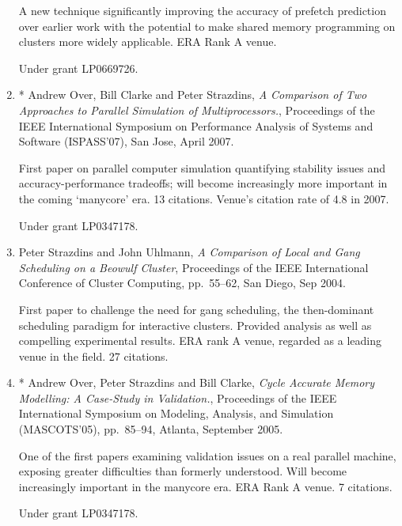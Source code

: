 \documentclass[a4paper,oneside,12pt]{article}
\begin{document}
\begin{enumerate}
A new technique significantly improving the accuracy of prefetch
prediction over earlier work with the potential to make shared memory
programming on clusters more widely applicable. ERA Rank A venue. 

Under grant LP0669726.

\item * Andrew Over, Bill Clarke and Peter Strazdins, 
{\em A Comparison of Two Approaches to Parallel Simulation of
      Multiprocessors.},
      Proceedings of the IEEE International Symposium on Performance Analysis of
      Systems and Software (ISPASS'07), San Jose, April 2007.

First paper on parallel computer simulation quantifying stability issues
and accuracy-performance tradeoffs; will become increasingly more
important in the coming `manycore' era. 13 citations. Venue's citation
rate of 4.8 in 2007.  

Under grant LP0347178.

\item  Peter Strazdins and John Uhlmann,
{\em A Comparison of Local and Gang Scheduling on a Beowulf
      Cluster}, Proceedings of the IEEE International Conference of Cluster
      Computing, pp.\ 55--62, San Diego, Sep 2004. 

First paper to challenge the need for gang scheduling, the
then-dominant scheduling paradigm for interactive clusters. 
Provided analysis as well as compelling experimental results.
ERA rank A venue, regarded as a leading venue in the field. 27 citations.


\item * Andrew Over, Peter Strazdins and Bill Clarke, {\em Cycle
  Accurate Memory Modelling: A Case-Study in Validation.}, Proceedings
  of the IEEE International Symposium on Modeling, Analysis, and
  Simulation (MASCOTS'05), pp.\ 85--94, Atlanta, September 2005.

One of the first papers examining validation issues on a real parallel
machine, exposing greater difficulties than formerly understood.
Will become increasingly important in the manycore era. 
ERA Rank A venue. 7 citations.

Under grant LP0347178.

\end{enumerate}

\end{document}
